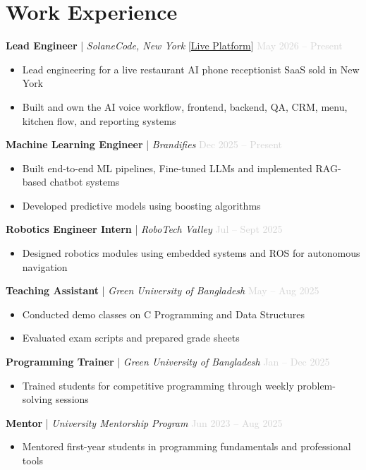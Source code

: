 \documentclass[letterpaper,11pt]{extarticle}
\begin{document}
\section{Work Experience}
\vspace{0.2cm}
\textbf{Lead Engineer} | \textit{SolaneCode, New York} \hfill [\href{https://remitjob.com/}{Live Platform}] \textcolor{lightgray}{May 2026 -- Present}
\begin{itemize}[noitemsep, topsep=0pt]
    \item Lead engineering for a live restaurant AI phone receptionist SaaS sold in New York
    \item Built and own the AI voice workflow, frontend, backend, QA, CRM, menu, kitchen flow, and reporting systems
\end{itemize}
\vspace{0.2cm}
\textbf{Machine Learning Engineer} | \textit{Brandifies} \hfill \textcolor{lightgray}{Dec 2025 -- Present}
\begin{itemize}[noitemsep, topsep=0pt]
    \item Built end-to-end ML pipelines, Fine-tuned LLMs and implemented RAG-based chatbot systems
    \item Developed predictive models using boosting algorithms
\end{itemize}
\vspace{0.2cm}
\textbf{Robotics Engineer Intern} | \textit{RoboTech Valley} \hfill \textcolor{lightgray}{Jul -- Sept 2025}
\begin{itemize}[noitemsep, topsep=0pt]
    \item Designed robotics modules using embedded systems and ROS for autonomous navigation
\end{itemize}
\vspace{0.2cm}
\textbf{Teaching Assistant} | \textit{Green University of Bangladesh} \hfill \textcolor{lightgray}{May -- Aug 2025}
\begin{itemize}[noitemsep, topsep=0pt]
    \item Conducted demo classes on C Programming and Data Structures
    \item Evaluated exam scripts and prepared grade sheets
\end{itemize}
\vspace{0.2cm}
\textbf{Programming Trainer} | \textit{Green University of Bangladesh} \hfill \textcolor{lightgray}{Jan -- Dec 2025}
\begin{itemize}[noitemsep, topsep=0pt]
    \item Trained students for competitive programming through weekly problem-solving sessions
\end{itemize}
\vspace{0.2cm}
\textbf{Mentor} | \textit{University Mentorship Program} \hfill \textcolor{lightgray}{Jun 2023 -- Aug 2025}
\begin{itemize}[noitemsep, topsep=0pt]
    \item Mentored first-year students in programming fundamentals and professional tools
\end{itemize}
\end{document}
